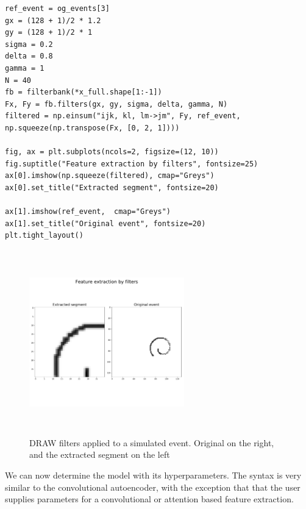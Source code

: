 \begin{minipage}{\linewidth}
\begin{lstlisting}[language=iPython]
ref_event = og_events[3]
gx = (128 + 1)/2 * 1.2
gy = (128 + 1)/2 * 1
sigma = 0.2
delta = 0.8
gamma = 1
N = 40
fb = filterbank(*x_full.shape[1:-1])
Fx, Fy = fb.filters(gx, gy, sigma, delta, gamma, N)
filtered = np.einsum("ijk, kl, lm->jm", Fy, ref_event, np.squeeze(np.transpose(Fx, [0, 2, 1])))

fig, ax = plt.subplots(ncols=2, figsize=(12, 10))
fig.suptitle("Feature extraction by filters", fontsize=25)
ax[0].imshow(np.squeeze(filtered), cmap="Greys")
ax[0].set_title("Extracted segment", fontsize=20)

ax[1].imshow(ref_event,  cmap="Greys")
ax[1].set_title("Original event", fontsize=20)
plt.tight_layout()
\end{lstlisting}
\end{minipage}
\begin{figure}[H]
	\centering
	\includegraphics[width=0.6\textwidth, height=8cm]{filtered.pdf}
	\caption[DRAW filters applied to simulated event]{DRAW filters applied to a simulated event. Original on the right, and the extracted segment on the left}
	\label{fig:draw_filter}
\end{figure}

\noindent We can now determine the model with its hyperparameters. The syntax is very similar to the convolutional autoencoder, with the exception that that the user supplies parameters for a convolutional or attention based feature extraction.


